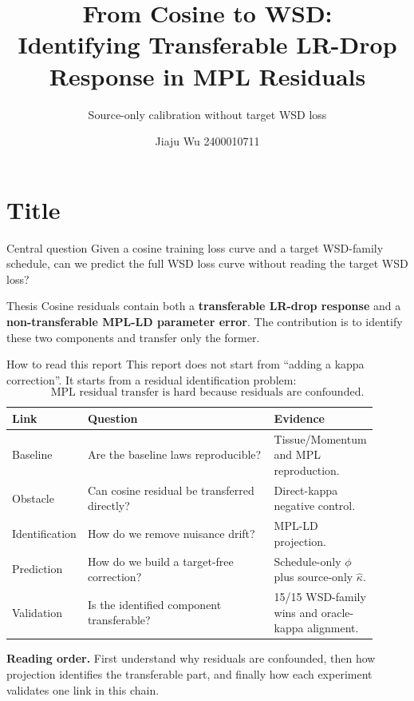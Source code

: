 \documentclass[9pt,aspectratio=169]{beamer}
\title[Residual identification in MPL residuals]{From Cosine to WSD:\\Identifying Transferable LR-Drop Response in MPL Residuals}
\subtitle[Source-only calibration]{Source-only calibration without target WSD loss}
\author[Jiaju Wu]{Jiaju Wu 2400010711}
\institute[]{Peking University \quad Deep Learning Course Task 2\\
\code{github.com/wjjpku/DL-final}}
\date{}
\newcommand{\hl}[1]{\textcolor{blue!60!black}{\textbf{#1}}}
\begin{document}
\section{Title}

{
\begin{frame}
\titlepage
\vspace{-1.2em}
\footnotesize
\begin{block}{Central question}
Given a cosine training loss curve and a target WSD-family schedule,
can we predict the full WSD loss curve without reading the target WSD loss?
\end{block}
\vspace{-0.45em}
\begin{block}{Thesis}
Cosine residuals contain both a \hl{transferable LR-drop response}
and a \hl{non-transferable MPL-LD parameter error}.
The contribution is to identify these two components and transfer only the former.
\end{block}
\end{frame}}

\begin{frame}{How to read this report}
\small
This report does not start from ``adding a kappa correction''.
It starts from a residual identification problem:
\[
\text{MPL residual transfer is hard because residuals are confounded.}
\]
\vfill
\begin{center}
\scriptsize
\begin{tabular}{L{0.17\linewidth}L{0.51\linewidth}L{0.23\linewidth}}
\toprule
Link & Question & Evidence\\
\midrule
Baseline & Are the baseline laws reproducible? & Tissue/Momentum and MPL reproduction.\\
\addlinespace
Obstacle & Can cosine residual be transferred directly? & Direct-kappa negative control.\\
\addlinespace
Identification & How do we remove nuisance drift? & MPL-LD projection.\\
\addlinespace
Prediction & How do we build a target-free correction? & Schedule-only \(\phi\) plus source-only \(\widehat\kappa\).\\
\addlinespace
Validation & Is the identified component transferable? & 15/15 WSD-family wins and oracle-kappa alignment.\\
\bottomrule
\end{tabular}
\end{center}
\vfill
\textbf{Reading order.}
First understand why residuals are confounded, then how projection identifies the transferable part,
and finally how each experiment validates one link in this chain.
\end{frame}
\end{document}
